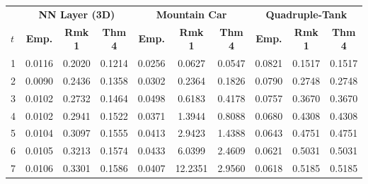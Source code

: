 \documentclass[11pt, a4paper, oneside,reqno]{amsart}
\theoremstyle{plain}
\begin{document}
\begin{table}[t]
    \centering
    \begin{tabular}{lccccccccc}
    \textbf{}          & \multicolumn{3}{c}{\textbf{NN Layer (3D)}}                                & \multicolumn{3}{c}{\textbf{Mountain Car}}                                          & \multicolumn{3}{c}{\textbf{Quadruple-Tank}}     \\ \cline{2-10} 
    $t$ & \textbf{Emp.} & \textbf{Rmk 1} & \multicolumn{1}{c|}{\textbf{Thm 4}} & \textbf{Emp.} & \textbf{Rmk 1}               & \multicolumn{1}{c|}{\textbf{Thm 4}} & \textbf{Emp.} & \textbf{Rmk 1} & \textbf{Thm 4} \\ \hline
    1                  & 0.0116             & 0.2020         & \multicolumn{1}{c|}{0.1214}         & 0.0256             & 0.0627                       & \multicolumn{1}{c|}{0.0547}         & 0.0821             & 0.1517         & 0.1517         \\
    2                  & 0.0090             & 0.2436         & \multicolumn{1}{c|}{0.1358}         & 0.0302             & 0.2364                       & \multicolumn{1}{c|}{0.1826}         & 0.0790             & 0.2748         & 0.2748         \\
    3                  & 0.0102             & 0.2732         & \multicolumn{1}{c|}{0.1464}         & 0.0498             & 0.6183                       & \multicolumn{1}{c|}{0.4178}         & 0.0757             & 0.3670         & 0.3670         \\
    4                  & 0.0102             & 0.2941         & \multicolumn{1}{c|}{0.1522}         & 0.0371             & 1.3944                       & \multicolumn{1}{c|}{0.8088}         & 0.0680             & 0.4308         & 0.4308         \\
    5                  & 0.0104             & 0.3097         & \multicolumn{1}{c|}{0.1555}         & 0.0413             & 2.9423                       & \multicolumn{1}{c|}{1.4388}         & 0.0643             & 0.4751         & 0.4751         \\
    6                  & 0.0105             & 0.3213         & \multicolumn{1}{c|}{0.1574}         & 0.0433             & 6.0399                       & \multicolumn{1}{c|}{2.4609}         & 0.0621             & 0.5031         & 0.5031         \\
    7                  & 0.0106             & 0.3301         & \multicolumn{1}{c|}{0.1586}         & 0.0407             & 12.2351                      & \multicolumn{1}{c|}{2.9560}         & 0.0618             & 0.5185         & 0.5185         \\

\end{tabular}
\end{table}
\end{document}
